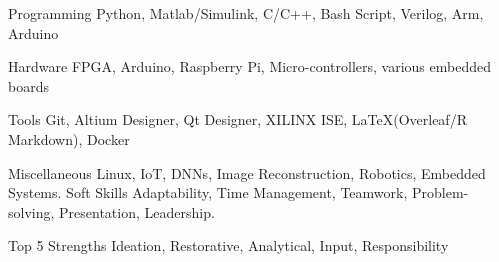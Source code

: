 

\begin{cvskills}

  \cvskill
    {Programming} %
    {Python, Matlab/Simulink, C/C++, Bash Script, Verilog, Arm, Arduino} %

  \cvskill
    {Hardware} %
    {FPGA, Arduino, Raspberry Pi, Micro-controllers, various embedded boards} %

  \cvskill
    {Tools} %
    {Git, Altium Designer, Qt Designer, XILINX ISE, \LaTeX (Overleaf/R Markdown), Docker} %
    
  \cvskill
    {Miscellaneous} %
    {Linux, IoT, DNNs, Image Reconstruction, Robotics, Embedded Systems.} %
  \cvskill
    {Soft Skills} %
    {Adaptability, Time Management, Teamwork, Problem-solving,  Presentation, Leadership.} %

  \cvskill
    {Top 5 Strengths} %
    {Ideation, Restorative,	Analytical,	Input, Responsibility} %

\end{cvskills}
